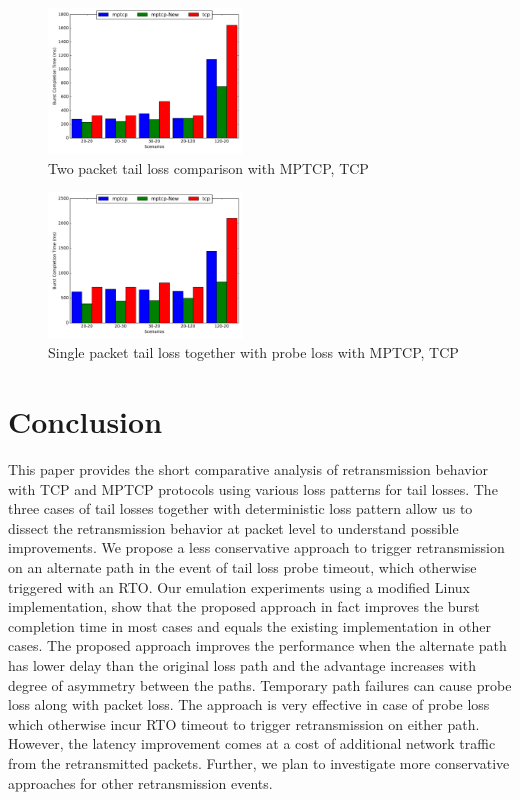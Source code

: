 \documentclass[10pt,conference,compsoc]{IEEEtran}
\begin{document}
\begin{figure}[!ht]
\begin{center}
\includegraphics[angle=0, width=0.46\textwidth, natwidth=578.16,natheight=433.62]{plots/2PNew.pdf}
\caption{Two packet tail loss comparison with MPTCP, TCP}\label{2pn}
\end{center}
\end{figure}

\begin{figure}[!ht]
\begin{center}
\includegraphics[angle=0, width=0.46\textwidth, natwidth=578.16,natheight=433.62]{plots/1PPNew.pdf}
\caption{Single packet tail loss together with probe loss with MPTCP, TCP}\label{1ppn}
\end{center}
\end{figure}


\section{Conclusion}\label{conc}
This paper provides the short comparative analysis of retransmission behavior with TCP and MPTCP protocols using various loss patterns for tail losses.
The three cases of tail losses together with deterministic loss pattern allow us to dissect the retransmission behavior at packet level to understand possible improvements.
We propose a less conservative approach to trigger retransmission on an alternate path in the event of tail loss probe timeout, which otherwise triggered with an RTO. 
Our emulation experiments  using a modified Linux implementation, show that the proposed approach in fact improves the burst completion time in most cases and equals the existing
implementation in other cases. The proposed approach improves the performance when the alternate path has lower delay than the original loss path and the advantage increases with degree of asymmetry between the paths. Temporary path failures can cause probe loss along with packet loss. The approach is very effective in case of probe loss which otherwise incur RTO timeout to trigger retransmission on either path. However, the latency improvement comes at a cost of additional network traffic from the retransmitted packets. Further, we plan to investigate more conservative approaches for other retransmission events.    
   


\end{document}

